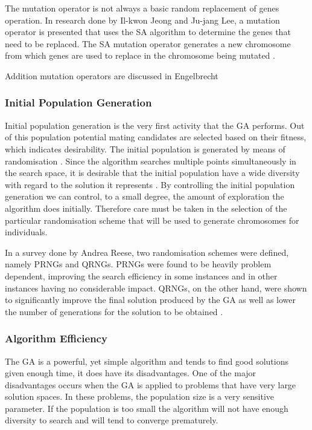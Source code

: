 The mutation operator is not always a basic random replacement of genes operation. In research done by Il-kwon Jeong and Ju-jang Lee\cite{AdaptiveSAGA}, a mutation operator is presented that uses the \gls{SA} algorithm to determine the genes that need to be replaced. The \gls{SA} mutation operator generates a new chromosome from which genes are used to replace in the chromosome being mutated \cite{AdaptiveSAGA}.

Addition mutation operators are discussed in Engelbrecht\cite{CompuIntelligenceIntro}
\subsubsection{Initial Population Generation}
Initial population generation is the very first activity that the \gls{GA} performs. Out of this population potential mating candidates are selected based on their fitness, which indicates desirability. The initial population is generated by means of randomisation \cite{SelfAdaptiveGA}. Since the algorithm searches multiple points simultaneously in the search space, it is desirable that the initial population have a wide diversity with regard to the solution it represents \cite{CombinedBranchBoundGA,DistributedHierarchicalGA}. By controlling the initial population generation we can control, to a small degree, the amount of exploration the algorithm does initially\cite{CombinedBranchBoundGA}. Therefore care must be taken in the selection of the particular randomisation scheme that will be used to generate chromosomes for individuals.

In a survey done by Andrea Reese\cite{RandomNumberGA}, two randomisation schemes were defined, namely  \glspl{PRNG} and \glspl{QRNG}. \glspl{PRNG} were found to be heavily problem dependent, improving the search efficiency in some instances and in other instances having no considerable impact. QRNGs, on the other hand, were shown to significantly improve the final solution produced by the \gls{GA} as well as lower the number of generations for the solution to be obtained \cite{RandomNumberGA}.

\subsubsection{Algorithm Efficiency}
The \gls{GA} is a powerful, yet simple algorithm and tends to find good solutions given enough time, it does have its disadvantages. One of the major disadvantages occurs when the \gls{GA} is applied to problems that have very large solution spaces. In these problems, the population size is a very sensitive parameter\cite{AdaptiveSAGA,HetergeneousGA,SelfAdaptiveDataMiningGA,PatternDetectionGA}. If the population is too small the algorithm will not have enough diversity to search and will tend to converge prematurely. 

